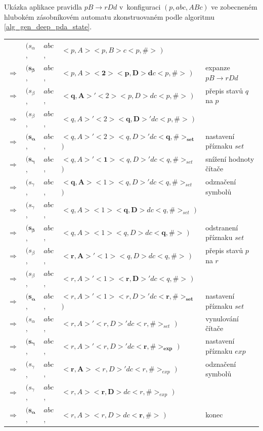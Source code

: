 \begin{Example}
Ukázka aplikace pravidla $pB \rightarrow r Dd$ v~konfiguraci $(p, abc, ABc)$ ve zobecneném hlubokém zásobníkovém automatu zkonstruovaném podle algoritmu \ref{alg_gen_deep_pda_state}.

\begin{center}
\begin{tabular}{llll|l}
                & $( s_{\alpha}$,  & $abc$, & $<p,A> <p,B> c <p, \#>$         $)$ &  \\
$\Rightarrow$   & $( \mathbf{s_{\beta}}$,   & $abc$, & $<p,A> \mathbf{<2> <p,D> d} c <p, \#>$         $)$ & expanze $pB \rightarrow r Dd$ \\
$\Rightarrow$   & $( s_{\beta}$,   & $abc$, & $\mathbf{<q,A>'} <2> <p,D> d c <p, \#>$         $)$ & přepis stavů $q$ na $p$\\
$\Rightarrow$   & $( s_{\beta}$,   & $abc$, & $<q,A>' <2> \mathbf{<q,D>'} d c <p, \#>$         $)$ & \\
$\Rightarrow$   & $( \mathbf{s_{\alpha}}$,   & $abc$, & $<q,A>' <2> <q,D>' d c \mathbf{<q, \#>_{set}}$         $)$ & nastavení příznaku $set$\\
$\Rightarrow$   & $( \mathbf{s_{\gamma}}$,  & $abc$, & $<q,A>' \mathbf{<1>} <q,D>' d c <q, \#>_{set}$  $)$ & snížení hodnoty čítače \\
$\Rightarrow$   & $( s_{\gamma}$,  & $abc$, & $\mathbf{<q,A>} <1> <q,D>' d c <q, \#>_{set}$  $)$ & odznačení symbolů \\
$\Rightarrow$   & $( s_{\gamma}$,  & $abc$, & $<q,A> <1> \mathbf{<q,D>} d c <q, \#>_{set}$  $)$ &  \\
$\Rightarrow$   & $( \mathbf{s_{\beta}}$,  & $abc$, & $<q,A> <1> <q,D> d c \mathbf{<q, \#>}$  $)$ &  odstranení příznaku $set$\\
$\Rightarrow$   & $( s_{\beta}$,  & $abc$, & $\mathbf{<r,A>'} <1> <q,D> d c <q, \#>$  $)$ &  přepis stavů $p$ na $r$\\
$\Rightarrow$   & $( s_{\beta}$,  & $abc$, & $<r,A>' <1> \mathbf{<r,D>'} d c <q, \#>$  $)$ &  \\
$\Rightarrow$   & $( \mathbf{s_{\alpha}}$,  & $abc$, & $<r,A>' <1> <r,D>' d c \mathbf{<r, \#>_{set}}$  $)$ &  nastavení příznaku $set$\\
$\Rightarrow$   & $( s_{\alpha}$,  & $abc$, & $<r,A>' <r,D>' d c <r, \#>_{set}$  $)$ &  vynulování čítače\\
$\Rightarrow$   & $( \mathbf{s_{\gamma}}$,  & $abc$, & $<r,A>' <r,D>' d c \mathbf{<r, \#>_{exp}}$  $)$ &  nastavení příznaku $exp$\\
$\Rightarrow$   & $( s_{\gamma}$,  & $abc$, & $\mathbf{<r,A>} <r,D>' d c <r, \#>_{exp}$  $)$ &  odznačení symbolů\\
$\Rightarrow$   & $( s_{\gamma}$,  & $abc$, & $<r,A> \mathbf{<r,D>} d c <r, \#>_{exp}$  $)$ &  \\
$\Rightarrow$   & $( \mathbf{s_{\alpha}}$,  & $abc$, & $<r,A> <r,D> d c \mathbf{<r, \#>}$  $)$ &  konec

\end{tabular}
\end{center}


\end{Example}


